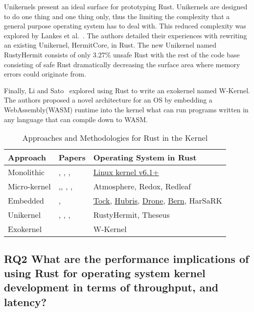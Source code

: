 \documentclass[sigconf]{acmart}
\begin{document}
Unikernels present an ideal surface for prototyping Rust. Unikernels are designed to do one thing
and one thing only, thus the limiting the complexity that a general purpose operating system has to
deal with. This reduced complexity was explored by Lankes et al.~\cite{Lankes2019-cm}. The authors
detailed their experiences with rewriting an existing Unikernel, HermitCore, in Rust. The new
Unikernel named RustyHermit consists of only 3.27\% unsafe Rust with the rest
of the code base consisting of safe Rust dramatically decreasing the surface area where memory errors
could originate from.

Finally, Li and Sato~\cite{Li2024-yb} explored using Rust to write an exokernel named W-Kernel. The authors
proposed a novel architecture for an OS by embedding a WebAssembly(WASM) runtime into the kernel
what can run programs written in any language that can compile down to WASM.

\begin{table*}
    \begin{tabular}{||l|l|l||}
    \hline
    Approach & Papers & Operating System in Rust\\
    \hline\hline
    Monolithic  & \cite{The_kernel_development_community_undated-iw}, \cite{Li2019-ru}, \cite{Miller2021-pg}, \cite{Oikawa2023-ms} & \href{https://docs.kernel.org/rust/}{Linux kernel v6.1+}\\
    Micro-kernel & \cite{Chen2023-wb},\cite{Liang2021-bo}, \cite{Liu2024-xe}, \cite{Narayanan2020-gs}, \cite{Narayanan2019-fd} & Atmosphere, Redox, Redleaf\\
    Embedded & \cite{Culic2022-bk}, \cite{Vishnunaryan2022-yd} & \href{https://github.com/tock/tock}{Tock}, \href{https://hubris.oxide.computer/}{Hubris}, \href{https://www.drone-os.com/}{Drone}, \href{https://bern-rtos.org/}{Bern}, HarSaRK \\
    Unikernel & \cite{Lankes2019-cm},  \cite{Boos2020-zh}, \cite{Ijaz2023-da}, \cite{Sung2020-bb}  & RustyHermit, Theseus \\
    Exokernel & \cite{Li2024-yb} & W-Kernel \\
    \hline
  \end{tabular}
  \caption{Approaches and Methodologies for Rust in the Kernel}
    \label{tab:RQ1}
\end{table*}


\subsection{RQ2  What are the performance implications of using Rust for operating system
      kernel development in terms of throughput, and  latency?}
\end{document}
